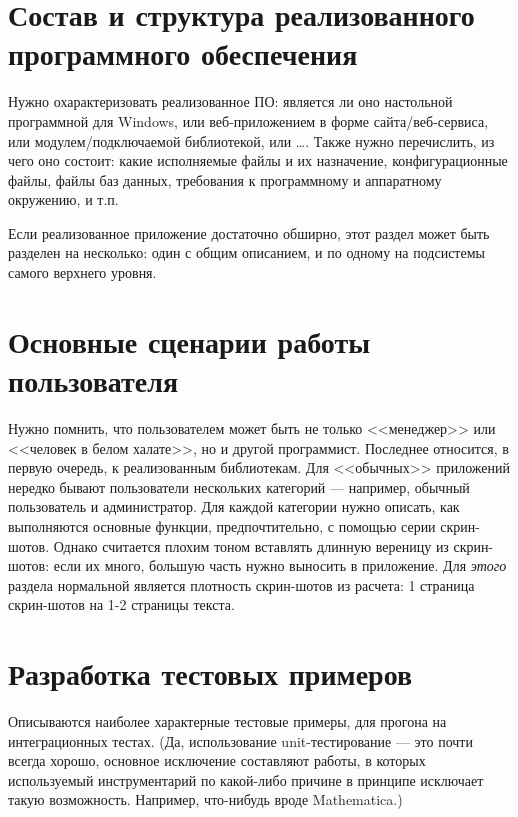 \section{Состав и структура реализованного программного обеспечения}

Нужно охарактеризовать реализованное ПО: является ли оно настольной программной для Windows, или веб-приложением в форме сайта/веб-сервиса, или модулем/подключаемой библиотекой, или \dots. Также нужно перечислить, из чего оно состоит: какие исполняемые файлы и их назначение, конфигурационные файлы, файлы баз данных, требования к программному и аппаратному окружению, и т.п.

Если реализованное приложение достаточно обширно, этот раздел может быть
разделен на несколько: один с общим описанием, и по одному на подсистемы самого
верхнего уровня.



\section{Основные сценарии работы пользователя}

Нужно помнить, что пользователем может быть не только <<менеджер>> или <<человек в белом халате>>, но и другой программист. Последнее относится, в первую очередь, к реализованным библиотекам. Для <<обычных>> приложений нередко бывают пользователи нескольких категорий --- например, обычный пользователь и администратор. Для каждой категории нужно описать, как выполняются основные функции, предпочтительно, с помощью серии скрин-шотов. Однако считается плохим тоном вставлять длинную вереницу из скрин-шотов: если их много, большую часть нужно выносить в приложение. Для \textit{этого} раздела нормальной является плотность скрин-шотов из расчета: 1 страница скрин-шотов на 1-2 страницы текста.





\section{Разработка тестовых примеров}

Описываются наиболее характерные тестовые примеры, для прогона на интеграционных тестах. (Да, использование unit-тестирование --- это почти всегда хорошо, основное исключение составляют работы, в которых используемый инструментарий по какой-либо причине в принципе исключает такую возможность. Например, что-нибудь вроде Mathematica.)

